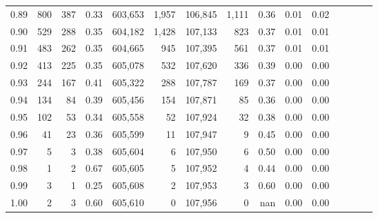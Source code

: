 \begin{tabular}{rrrcrrrrrrrrrrr}
0.89 &     800 &    387 &                                       0.33 &  603,653 &    1,957 &  106,845 &    1,111 &  0.36 &  0.01 &                         0.02 \\
0.90 &     529 &    288 &                                       0.35 &  604,182 &    1,428 &  107,133 &      823 &  0.37 &  0.01 &                         0.01 \\
0.91 &     483 &    262 &                                       0.35 &  604,665 &      945 &  107,395 &      561 &  0.37 &  0.01 &                         0.01 \\
0.92 &     413 &    225 &                                       0.35 &  605,078 &      532 &  107,620 &      336 &  0.39 &  0.00 &                         0.00 \\
0.93 &     244 &    167 &                                       0.41 &  605,322 &      288 &  107,787 &      169 &  0.37 &  0.00 &                         0.00 \\
0.94 &     134 &     84 &                                       0.39 &  605,456 &      154 &  107,871 &       85 &  0.36 &  0.00 &                         0.00 \\
0.95 &     102 &     53 &                                       0.34 &  605,558 &       52 &  107,924 &       32 &  0.38 &  0.00 &                         0.00 \\
0.96 &      41 &     23 &                                       0.36 &  605,599 &       11 &  107,947 &        9 &  0.45 &  0.00 &                         0.00 \\
0.97 &       5 &      3 &                                       0.38 &  605,604 &        6 &  107,950 &        6 &  0.50 &  0.00 &                         0.00 \\
0.98 &       1 &      2 &                                       0.67 &  605,605 &        5 &  107,952 &        4 &  0.44 &  0.00 &                         0.00 \\
0.99 &       3 &      1 &                                       0.25 &  605,608 &        2 &  107,953 &        3 &  0.60 &  0.00 &                         0.00 \\
1.00 &       2 &      3 &                                       0.60 &  605,610 &        0 &  107,956 &        0 &   nan &  0.00 &                         0.00 \\
\bottomrule
\end{tabular}
